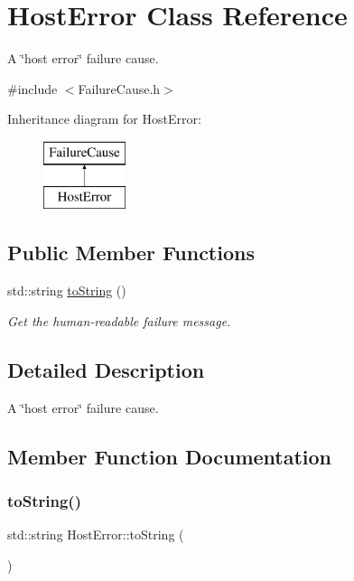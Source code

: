 \hypertarget{class_host_error}{}\section{Host\+Error Class Reference}
\label{class_host_error}


A \char`\"{}host error\char`\"{} failure cause.  




{\ttfamily \#include $<$Failure\+Cause.\+h$>$}

Inheritance diagram for Host\+Error\+:\begin{figure}[H]
\begin{center}
\leavevmode
\includegraphics[height=2.000000cm]{class_host_error}
\end{center}
\end{figure}
\subsection*{Public Member Functions}
\begin{DoxyCompactItemize}
\item 
std\+::string \hyperlink{class_host_error_a26a140d1ac782a430f580deff758bc4d}{to\+String} ()
\begin{DoxyCompactList}\small\item\em Get the human-\/readable failure message. \end{DoxyCompactList}\end{DoxyCompactItemize}


\subsection{Detailed Description}
A \char`\"{}host error\char`\"{} failure cause. 

\subsection{Member Function Documentation}
\mbox{\label{class_host_error_a26a140d1ac782a430f580deff758bc4d}} 
\subsubsection{\texorpdfstring{to\+String()}{toString()}}
{\footnotesize\ttfamily std\+::string Host\+Error\+::to\+String (\begin{DoxyParamCaption}{ }\end{DoxyParamCaption})}



